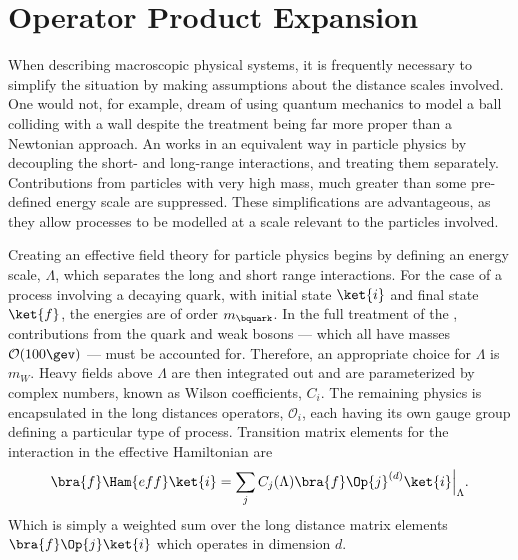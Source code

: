 \section{Operator Product Expansion}

When describing macroscopic physical systems, it is frequently necessary to simplify the situation
by making assumptions about the distance scales involved.
One would not, for example, dream of using quantum mechanics to model a ball colliding with a wall
despite the treatment being far more proper than a Newtonian approach.
An \EFT works in an equivalent way in particle physics
by decoupling the short- and long-range interactions, and treating them separately.
Contributions from particles with very high mass, much greater than some pre-defined energy scale
are suppressed.
These simplifications are advantageous, as they allow processes to be modelled at a scale
relevant to the particles involved.

Creating an effective field theory for particle physics begins by defining an energy scale,
$\Lambda$, which separates the long and short range interactions.
For the case of a process involving a decaying \bquark quark, with initial state $\ket{i}$ and
final state $\ket{f}$,
the energies are of order $m_\bquark$.
In the full treatment of the \sm, contributions from the \tquark quark and weak bosons --- which all
have masses $\mathcal{O}(100\gev)$ --- must be accounted for.
Therefore, an appropriate choice for $\Lambda$ is \approx$m_W$.
Heavy fields above $\Lambda$ are then integrated out and are parameterized by complex numbers,
known as Wilson coefficients, $C_i$.
The remaining physics is encapsulated in the long distances operators, $\mathcal{O}_i$, each having
its own gauge group defining a particular type of process.
Transition matrix elements for the interaction in the effective Hamiltonian are
\begin{equation}
  \bra{f}\Ham{eff}\ket{i} =
  \sum_j C_j(\Lambda)\bra{f}\Op{j}^{(d)}\ket{i}\Big|_{\Lambda}.
  \label{eq:th:opeham}
\end{equation}
Which is simply a weighted sum over the long distance matrix elements $\bra{f}\Op{j}\ket{i}$ which
operates in dimension $d$.

